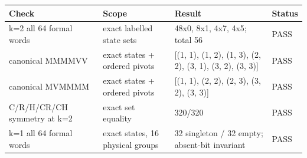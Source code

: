 \begin{tabular}{llll}
\toprule
Check & Scope & Result & Status \\
\midrule
k=2 all 64 formal words & exact labelled state sets & 48x0, 8x1, 4x7, 4x5; total 56 & PASS \\
canonical MMMMVV & exact states + ordered pivots & [(1, 1), (1, 2), (1, 3), (2, 2), (3, 1), (3, 2), (3, 3)] & PASS \\
canonical MVMMMM & exact states + ordered pivots & [(1, 1), (2, 2), (2, 3), (3, 2), (3, 3)] & PASS \\
C/R/H/CR/CH symmetry at k=2 & exact set equality & 320/320 & PASS \\
k=1 all 64 formal words & exact states, 16 physical groups & 32 singleton / 32 empty; absent-bit invariant & PASS \\
\bottomrule
\end{tabular}
